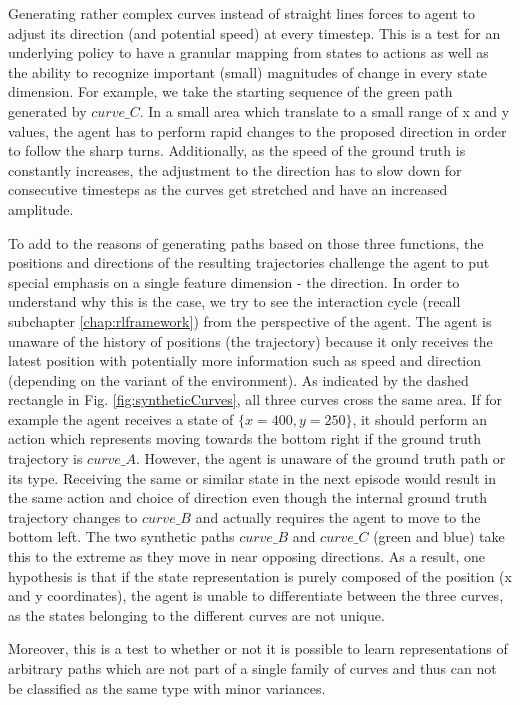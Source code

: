 Generating rather complex curves instead of straight lines forces to agent to adjust its direction (and potential speed) at every timestep. This is a test for an underlying policy to have a granular mapping from states to actions as well as the ability to recognize important (small) magnitudes of change in every state dimension. For example, we take the starting sequence of the green path generated by $curve\_C$. In a small area which translate to a small range of x and y values, the agent has to perform rapid changes to the proposed direction in order to follow the sharp turns. Additionally, as the speed of the ground truth is constantly increases, the adjustment to the direction has to slow down for consecutive timesteps as the curves get stretched and have an increased amplitude.
\par
To add to the reasons of generating paths based on those three functions, the positions and directions of the resulting trajectories challenge the agent to put special emphasis on a single feature dimension - the direction.  In order to understand why this is the case, we try to see the interaction cycle (recall subchapter \ref{chap:rlframework}) from the perspective of the agent. The agent is unaware of the history of positions (the trajectory) because it only receives the latest position with potentially more information such as speed and direction (depending on the variant of the environment). As indicated by the dashed rectangle in Fig. \ref{fig:syntheticCurves}, all three curves cross the same area. If for example the agent receives a state of $\{x=400, y=250\}$, it should perform an action which represents moving towards the bottom right if the ground truth trajectory is $curve\_A$. However, the agent is unaware of the ground truth path or its type. Receiving the same or similar state in the next episode would result in the same action and choice of direction even though the internal ground truth trajectory changes to $curve\_B$ and actually requires the agent to move to the bottom left. The two synthetic paths $curve\_B$ and $curve\_C$ (green and blue) take this to the extreme as they move in near opposing directions. As a result, one hypothesis is that if the state representation is purely composed of the position (x and y coordinates), the agent is unable to differentiate between the three curves, as the states belonging to the different curves are not unique.
\par
Moreover, this is a test to whether or not it is possible to learn representations of arbitrary paths which are not part of a single family of curves and thus can not be classified as the same type with minor variances.
